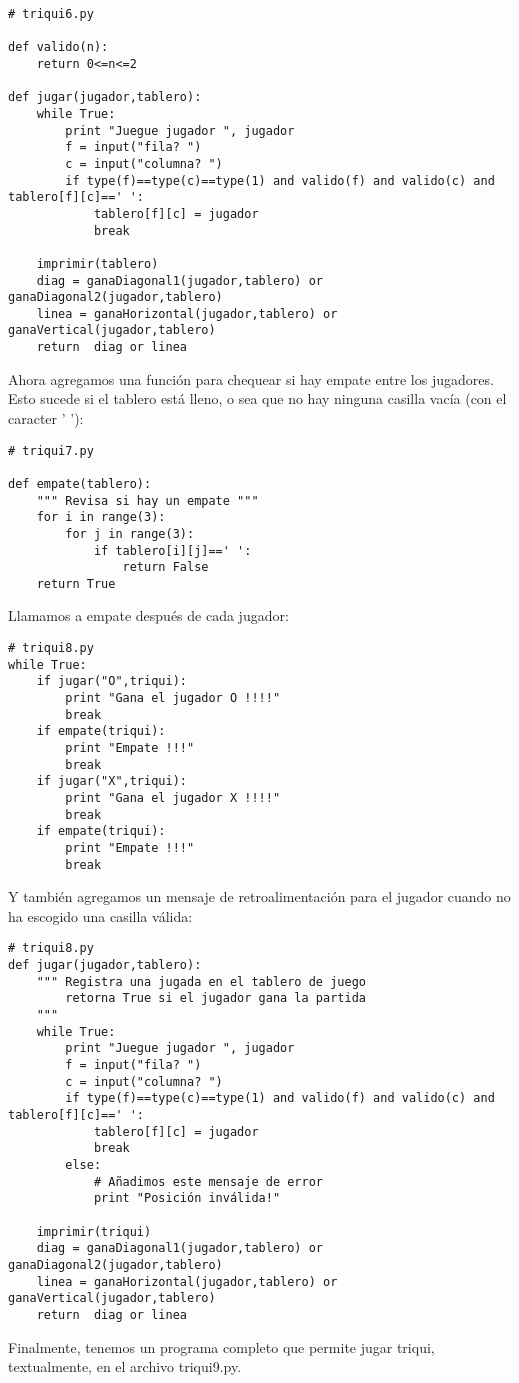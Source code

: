 \beforeverb
\begin{verbatim}
# triqui6.py

def valido(n):
    return 0<=n<=2
    
def jugar(jugador,tablero):
    while True:     
        print "Juegue jugador ", jugador
        f = input("fila? ")
        c = input("columna? ")
        if type(f)==type(c)==type(1) and valido(f) and valido(c) and tablero[f][c]==' ':
            tablero[f][c] = jugador
            break      

    imprimir(tablero)
    diag = ganaDiagonal1(jugador,tablero) or ganaDiagonal2(jugador,tablero)
    linea = ganaHorizontal(jugador,tablero) or ganaVertical(jugador,tablero)
    return  diag or linea

\end{verbatim}
\afterverb


Ahora agregamos una función para chequear si hay empate entre los jugadores.
Esto sucede si el tablero está lleno, o sea que no hay ninguna casilla vacía 
(con el caracter ' '):

\beforeverb
\begin{verbatim}
# triqui7.py

def empate(tablero):
    """ Revisa si hay un empate """
    for i in range(3):
        for j in range(3):
            if tablero[i][j]==' ':
                return False
    return True

\end{verbatim}
\afterverb

Llamamos a empate después de cada jugador:
\beforeverb
\begin{verbatim}
# triqui8.py
while True:
    if jugar("O",triqui):
        print "Gana el jugador O !!!!"
        break
    if empate(triqui):
        print "Empate !!!"
        break
    if jugar("X",triqui):
        print "Gana el jugador X !!!!"
        break
    if empate(triqui):
        print "Empate !!!"
        break
\end{verbatim}
\afterverb

Y también agregamos un mensaje de retroalimentación para el jugador cuando no 
ha escogido una casilla válida:

\beforeverb
\begin{verbatim}
# triqui8.py
def jugar(jugador,tablero):
    """ Registra una jugada en el tablero de juego
        retorna True si el jugador gana la partida
    """
    while True:     
        print "Juegue jugador ", jugador
        f = input("fila? ")
        c = input("columna? ")
        if type(f)==type(c)==type(1) and valido(f) and valido(c) and tablero[f][c]==' ':
            tablero[f][c] = jugador
            break
        else:
            # Añadimos este mensaje de error
            print "Posición inválida!"

    imprimir(triqui)
    diag = ganaDiagonal1(jugador,tablero) or ganaDiagonal2(jugador,tablero)
    linea = ganaHorizontal(jugador,tablero) or ganaVertical(jugador,tablero)
    return  diag or linea
\end{verbatim}
\afterverb

Finalmente, tenemos un programa completo que permite jugar triqui, textualmente, en 
el archivo triqui9.py.

